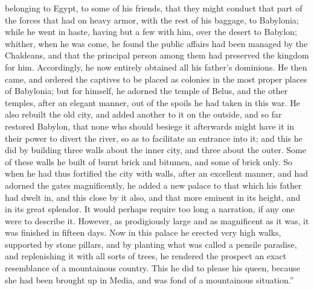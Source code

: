 belonging to Egypt, to some of his friends, that they might conduct that
part of the forces that had on heavy armor, with the rest of his baggage,
to Babylonia; while he went in haste, having but a few with him, over the
desert to Babylon; whither, when he was come, he found the public affairs
had been managed by the Chaldeans, and that the principal person among
them had preserved the kingdom for him. Accordingly, he now entirely
obtained all his father's dominions. He then came, and ordered the
captives to be placed as colonies in the most proper places of Babylonia;
but for himself, he adorned the temple of Belus, and the other temples,
after an elegant manner, out of the spoils he had taken in this war. He
also rebuilt the old city, and added another to it on the outside, and so
far restored Babylon, that none who should besiege it afterwards might
have it in their power to divert the river, so as to facilitate an
entrance into it; and this he did by building three walls about the inner
city, and three about the outer. Some of these walls he built of burnt
brick and bitumen, and some of brick only. So when he had thus fortified
the city with walls, after an excellent manner, and had adorned the gates
magnificently, he added a new palace to that which his father had dwelt
in, and this close by it also, and that more eminent in its height, and in
its great splendor. It would perhaps require too long a narration, if any
one were to describe it. However, as prodigiously large and as magnificent
as it was, it was finished in fifteen days. Now in this palace he erected
very high walks, supported by stone pillars, and by planting what was
called a pensile paradise, and replenishing it with all sorts of trees, he
rendered the prospect an exact resemblance of a mountainous country. This
he did to please his queen, because she had been brought up in Media, and
was fond of a mountainous situation.''

